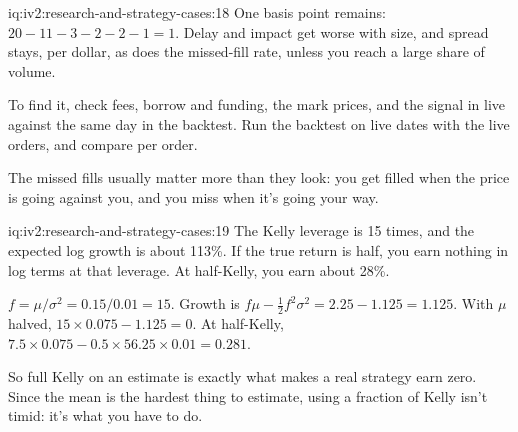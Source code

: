 \begin{solution}{iq:iv2:research-and-strategy-cases:18}
One basis point remains: $20 - 11 - 3 - 2 - 2 - 1 = 1$. Delay and impact get worse with size, and spread stays, per dollar, as does the missed-fill rate, unless you reach a large share of volume.

To find it, check fees, borrow and funding, the mark prices, and the signal in live against the same day in the backtest. Run the backtest on live dates with the live orders, and compare per order.

The missed fills usually matter more than they look: you get filled when the price is going against you, and you miss when it's going your way.

\end{solution}

\begin{solution}{iq:iv2:research-and-strategy-cases:19}
The Kelly leverage is 15 times, and the expected log growth is about 113\%. If the true return is half, you earn nothing in log terms at that leverage. At half-Kelly, you earn about 28\%.

$f = \mu/\sigma^2 = 0.15/0.01 = 15$. Growth is $f\mu - \tfrac12 f^2\sigma^2 = 2.25 - 1.125 = 1.125$. With $\mu$ halved, $15 \times 0.075 - 1.125 = 0$. At half-Kelly, $7.5 \times 0.075 - 0.5 \times 56.25 \times 0.01 = 0.281$.

So full Kelly on an estimate is exactly what makes a real strategy earn zero. Since the mean is the hardest thing to estimate, using a fraction of Kelly isn't timid: it's what you have to do.

\end{solution}

